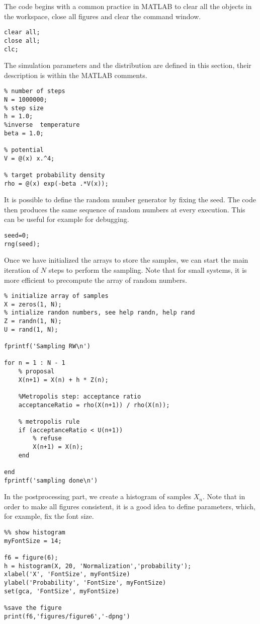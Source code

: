 \documentclass{scrartcl}
\begin{document}
The code begins with a common practice in MATLAB to clear all the objects in the workspace, close all figures and clear the command window.
\begin{verbatim}
clear all;
close all;
clc;
\end{verbatim}
The simulation parameters and the distribution are defined in this section, their description is within the MATLAB comments.
\begin{verbatim}
% number of steps 
N = 1000000;
% step size
h = 1.0;
%inverse  temperature 
beta = 1.0;

% potential
V = @(x) x.^4;

% target probability density
rho = @(x) exp(-beta .*V(x));
\end{verbatim}
It is possible to define the random number generator by fixing the seed. The code then produces the same sequence of random numbers at every execution. This can be useful for example for debugging.
\begin{verbatim}
seed=0;
rng(seed);
\end{verbatim}
Once we have initialized the arrays to store the samples, we can start the main iteration of $N$ steps to perform the sampling. Note that for small systems, it is more efficient to precompute the array of random numbers.
\begin{verbatim}
% initialize array of samples
X = zeros(1, N); 
% intialize randon numbers, see help randn, help rand
Z = randn(1, N);
U = rand(1, N);

fprintf('Sampling RW\n')

for n = 1 : N - 1    
    % proposal 
    X(n+1) = X(n) + h * Z(n);
    
    %Metropolis step: acceptance ratio
    acceptanceRatio = rho(X(n+1)) / rho(X(n));
    
    % metropolis rule
    if (acceptanceRatio < U(n+1))
        % refuse
        X(n+1) = X(n);
    end
    
end
fprintf('sampling done\n')
\end{verbatim}
In the postprocessing part, we create a histogram of samples $X_n$. Note that in order to make all figures consistent, it is a good idea to define parameters, which, for example, fix the font size. 
\begin{verbatim}
%% show histogram
myFontSize = 14;

f6 = figure(6);
h = histogram(X, 20, 'Normalization','probability');
xlabel('X', 'FontSize', myFontSize)
ylabel('Probability', 'FontSize', myFontSize)
set(gca, 'FontSize', myFontSize)

%save the figure
print(f6,'figures/figure6','-dpng')
\end{verbatim}
\end{document}
